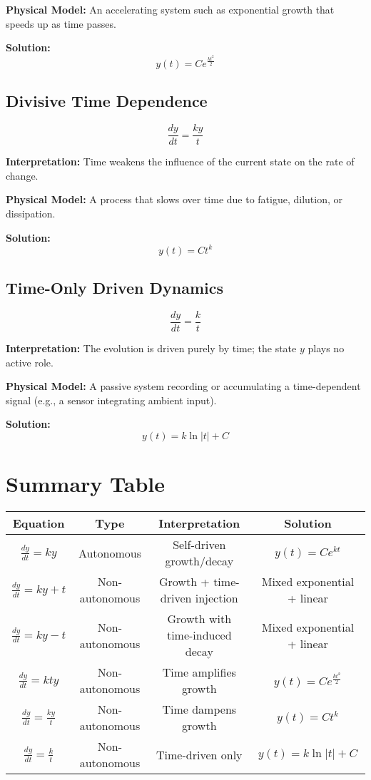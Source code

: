 \documentclass[12pt]{article}
\begin{document}
	\textbf{Physical Model:} An accelerating system such as exponential growth that speeds up as time passes.
	
	\textbf{Solution:}  
	$$
	y(t) = Ce^{\frac{kt^2}{2}}
	$$
	
	\subsection{Divisive Time Dependence}
	$$
	\frac{dy}{dt} = \frac{ky}{t}
	$$
	
	\textbf{Interpretation:} Time weakens the influence of the current state on the rate of change.
	
	\textbf{Physical Model:} A process that slows over time due to fatigue, dilution, or dissipation.
	
	\textbf{Solution:}  
	$$
	y(t) = Ct^k
	$$
	
	\subsection{Time-Only Driven Dynamics}
	$$
	\frac{dy}{dt} = \frac{k}{t}
	$$
	
	\textbf{Interpretation:} The evolution is driven purely by time; the state $y$ plays no active role.
	
	\textbf{Physical Model:} A passive system recording or accumulating a time-dependent signal (e.g., a sensor integrating ambient input).
	
	\textbf{Solution:}  
	$$
	y(t) = k \ln |t| + C
	$$
	
	\section{Summary Table}
	
	\begin{center}
		\begin{tabular}{|c|c|c|c|}
			\hline
			\textbf{Equation} & \textbf{Type} & \textbf{Interpretation} & \textbf{Solution} \\
			\hline
			$ \frac{dy}{dt} = ky $ & Autonomous & Self-driven growth/decay & $ y(t) = Ce^{kt} $ \\
			\hline
			$ \frac{dy}{dt} = ky + t $ & Non-autonomous & Growth + time-driven injection & Mixed exponential + linear \\
			\hline
			$ \frac{dy}{dt} = ky - t $ & Non-autonomous & Growth with time-induced decay & Mixed exponential + linear \\
			\hline
			$ \frac{dy}{dt} = kty $ & Non-autonomous & Time amplifies growth & $ y(t) = Ce^{\frac{kt^2}{2}} $ \\
			\hline
			$ \frac{dy}{dt} = \frac{ky}{t} $ & Non-autonomous & Time dampens growth & $ y(t) = Ct^k $ \\
			\hline
			$ \frac{dy}{dt} = \frac{k}{t} $ & Non-autonomous & Time-driven only & $ y(t) = k \ln |t| + C $ \\
			\hline
		\end{tabular}
	\end{center}
	
\end{document}
